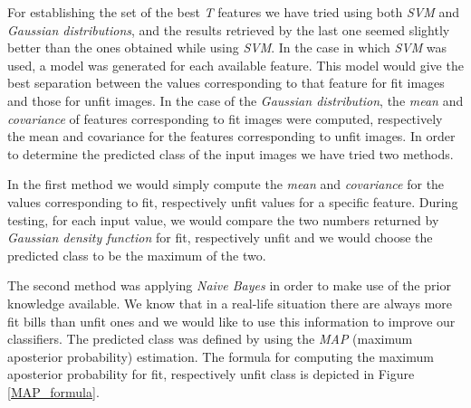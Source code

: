 \documentclass[11pt,twocolumn]{article}
\begin{document}
			For establishing the set of the best \emph{T} features we have tried using both \emph{SVM} and \emph{Gaussian distributions}, and the results retrieved by the last one seemed slightly better than the ones obtained while using \emph{SVM}. In the case in which \emph{SVM} was used, a model was generated for each available feature. This model would give the best separation between the values corresponding to that feature for fit images and those for unfit images. In the case of the \emph{Gaussian distribution}, the \emph{mean} and \emph{covariance} of features corresponding to fit images were computed, respectively the mean and covariance for the features corresponding to unfit images. In order to determine the predicted class of the input images we have tried two methods.

			In the first method we would simply compute the \emph{mean} and \emph{covariance} for the values corresponding to fit, respectively unfit values for a specific feature. During testing, for each input value, we would compare the two numbers returned by \emph{Gaussian density function} for fit, respectively unfit and we would choose the predicted class to be the maximum of the two.

			The second method was applying \emph{Naive Bayes} in order to make use of the prior knowledge available. We know that in a real-life situation there are always more fit bills than unfit ones and we would like to use this information to improve our classifiers. The predicted class was defined by using the \emph{MAP} (maximum aposterior probability) estimation. The formula for computing the maximum aposterior probability for fit, respectively unfit class is depicted in Figure \ref{MAP_formula}.
\end{document}
